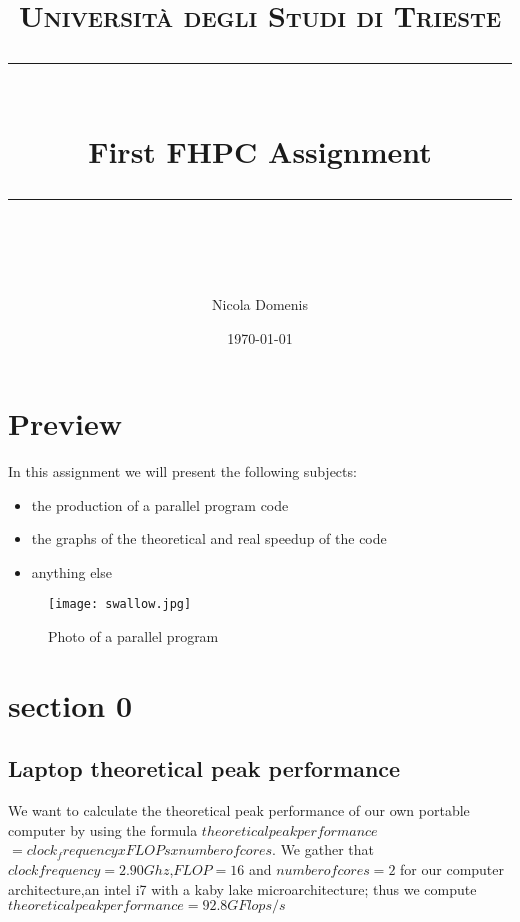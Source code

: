 \documentclass[11pt]{scrartcl} %
\title{	
	\normalfont\normalsize
	\textsc{Università degli Studi di Trieste}\\ %
	\vspace{25pt} %
	\rule{\linewidth}{0.5pt}\\ %
	\vspace{20pt} %
	{\huge First FHPC Assignment}\\ %
	\vspace{12pt} %
	\rule{\linewidth}{2pt}\\ %
	\vspace{12pt} %
}
\author{\LARGE Nicola Domenis} %
\date{\normalsize\today} %
\begin{document}
\maketitle %


\section{Preview}
 
In this assignment we will present the following subjects:

\begin{itemize}
	\item the production of a parallel program code
	\item the graphs of the theoretical and real speedup of the code
	\item anything else
\end{itemize}


\begin{figure}[h] %
	\centering
	\texttt{[image: swallow.jpg]} %
	\caption{Photo of a parallel program}
\end{figure}

\section{section 0}
\subsection{Laptop theoretical peak performance}

We want to calculate the theoretical peak performance of our own portable computer by using the formula \textit{$theoretical peak performance$} $= clock_frequency x FLOPs x number of cores$.
We gather that $clock frequency = 2.90 Ghz$,$ FLOP = 16$ and $numberofcores = 2$ for our computer architecture,an intel i7 with a kaby lake microarchitecture; thus we compute $theoretical peak performance = 92.8 GFlops/s$
%
\end{document}
